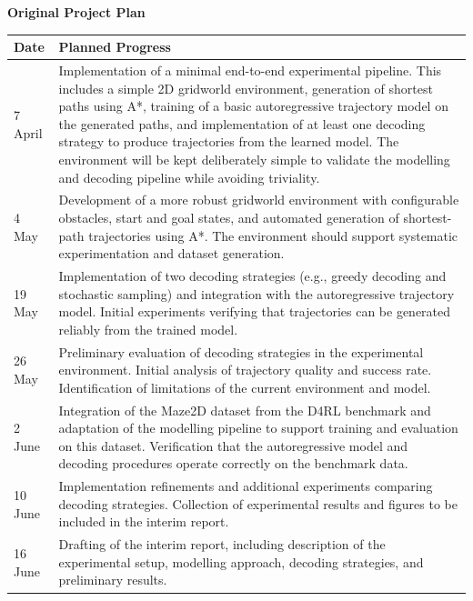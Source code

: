 \documentclass[12pt]{article}
\begin{document}
\noindent\textbf{Original Project Plan}

\begin{longtable}{|p{3cm}|p{11cm}|}
\hline
\textbf{Date} & \textbf{Planned Progress} \\
\hline

7 April &
Implementation of a minimal end-to-end experimental pipeline. This includes a simple 2D gridworld environment, generation of shortest paths using A*, training of a basic autoregressive trajectory model on the generated paths, and implementation of at least one decoding strategy to produce trajectories from the learned model. The environment will be kept deliberately simple to validate the modelling and decoding pipeline while avoiding triviality. \\
\hline

4 May &
Development of a more robust gridworld environment with configurable obstacles, start and goal states, and automated generation of shortest-path trajectories using A*. The environment should support systematic experimentation and dataset generation. \\
\hline

19 May &
Implementation of two decoding strategies (e.g., greedy decoding and stochastic sampling) and integration with the autoregressive trajectory model. Initial experiments verifying that trajectories can be generated reliably from the trained model. \\
\hline

26 May &
Preliminary evaluation of decoding strategies in the experimental environment. Initial analysis of trajectory quality and success rate. Identification of limitations of the current environment and model. \\
\hline

2 June &
Integration of the Maze2D dataset from the D4RL benchmark and adaptation of the modelling pipeline to support training and evaluation on this dataset. Verification that the autoregressive model and decoding procedures operate correctly on the benchmark data. \\
\hline

10 June &
Implementation refinements and additional experiments comparing decoding strategies. Collection of experimental results and figures to be included in the interim report. \\
\hline

16 June &
Drafting of the interim report, including description of the experimental setup, modelling approach, decoding strategies, and preliminary results. \\
\hline


\end{longtable}
\end{document}
